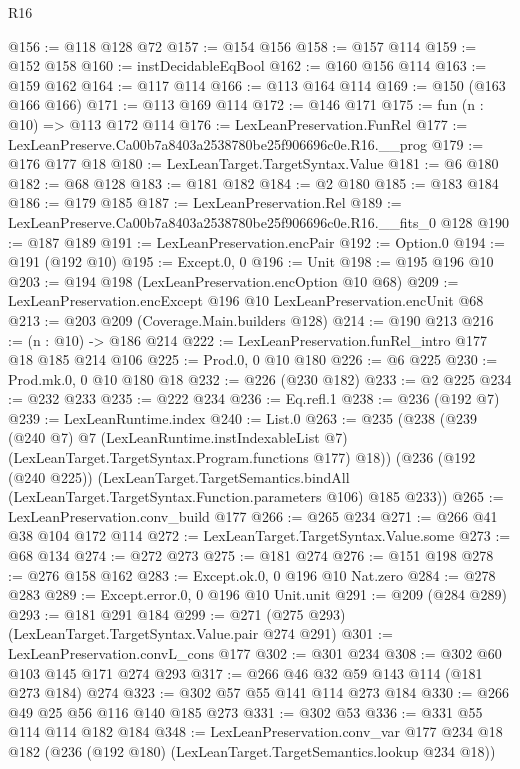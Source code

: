 \begin{lexlean}{R16}
\begin{coremodule}
@156 := @118 @128 @72
@157 := @154 @156
@158 := @157 @114
@159 := @152 @158
@160 := instDecidableEqBool
@162 := @160 @156 @114
@163 := @159 @162
@164 := @117 @114
@166 := @113 @164 @114
@169 := @150 (@163 @166 @166)
@171 := @113 @169 @114
@172 := @146 @171
@175 := fun (n : @10) => @113 @172 @114
@176 := LexLeanPreservation.FunRel
@177 := LexLeanPreserve.Ca00b7a8403a2538780be25f906696c0e.R16.__prog
@179 := @176 @177 @18
@180 := LexLeanTarget.TargetSyntax.Value
@181 := @6 @180
@182 := @68 @128
@183 := @181 @182
@184 := @2 @180
@185 := @183 @184
@186 := @179 @185
@187 := LexLeanPreservation.Rel
@189 := LexLeanPreserve.Ca00b7a8403a2538780be25f906696c0e.R16.__fits_0 @128
@190 := @187 @189
@191 := LexLeanPreservation.encPair
@192 := Option.{0}
@194 := @191 (@192 @10)
@195 := Except.{0, 0}
@196 := Unit
@198 := @195 @196 @10
@203 := @194 @198 (LexLeanPreservation.encOption @10 @68)
@209 := LexLeanPreservation.encExcept @196 @10 LexLeanPreservation.encUnit @68
@213 := @203 @209 (Coverage.Main.builders @128)
@214 := @190 @213
@216 := (n : @10) -> @186 @214
@222 := LexLeanPreservation.funRel_intro @177 @18 @185 @214 @106
@225 := Prod.{0, 0} @10 @180
@226 := @6 @225
@230 := Prod.mk.{0, 0} @10 @180 @18
@232 := @226 (@230 @182)
@233 := @2 @225
@234 := @232 @233
@235 := @222 @234
@236 := Eq.refl.{1}
@238 := @236 (@192 @7)
@239 := LexLeanRuntime.index
@240 := List.{0}
@263 := @235
    (@238
      (@239
        (@240 @7)
        @7
        (LexLeanRuntime.instIndexableList @7)
        (LexLeanTarget.TargetSyntax.Program.functions @177)
        @18))
    (@236
      (@192 (@240 @225))
      (LexLeanTarget.TargetSemantics.bindAll
        (LexLeanTarget.TargetSyntax.Function.parameters @106)
        @185
        @233))
@265 := LexLeanPreservation.conv_build @177
@266 := @265 @234
@271 := @266 @41 @38 @104 @172 @114
@272 := LexLeanTarget.TargetSyntax.Value.some
@273 := @68 @134
@274 := @272 @273
@275 := @181 @274
@276 := @151 @198
@278 := @276 @158 @162
@283 := Except.ok.{0, 0} @196 @10 Nat.zero
@284 := @278 @283
@289 := Except.error.{0, 0} @196 @10 Unit.unit
@291 := @209 (@284 @289)
@293 := @181 @291 @184
@299 := @271 (@275 @293) (LexLeanTarget.TargetSyntax.Value.pair @274 @291)
@301 := LexLeanPreservation.convL_cons @177
@302 := @301 @234
@308 := @302 @60 @103 @145 @171 @274 @293
@317 := @266 @46 @32 @59 @143 @114 (@181 @273 @184) @274
@323 := @302 @57 @55 @141 @114 @273 @184
@330 := @266 @49 @25 @56 @116 @140 @185 @273
@331 := @302 @53
@336 := @331 @55 @114 @114 @182 @184
@348 := LexLeanPreservation.conv_var
    @177
    @234
    @18
    @182
    (@236 (@192 @180) (LexLeanTarget.TargetSemantics.lookup @234 @18))

\end{coremodule}
\end{lexlean}
